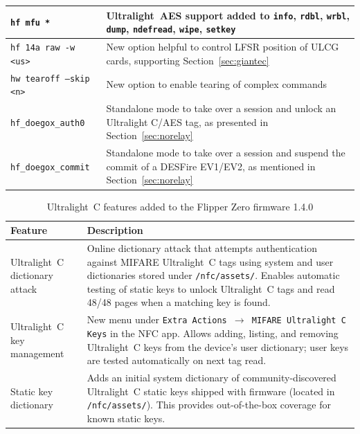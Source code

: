 \documentclass[10pt,letterpaper]{article}
\begin{document}
\begin{table}[ht]
\begin{tabularx}{\textwidth}{|l|X|}
    {\small \texttt{hf mfu *}} & Ultralight~AES support added to \texttt{info}, \texttt{rdbl}, \texttt{wrbl}, \texttt{dump}, \texttt{ndefread}, \texttt{wipe}, \texttt{setkey}\\ \hline
    {\small \texttt{hf 14a raw -w <us>}} & New option helpful to control LFSR position of ULCG cards, supporting Section~\ref{sec:giantec} \\ \hline
    {\small \texttt{hw tearoff --skip <n>}} & New option to enable tearing of complex commands \\ \hline
    {\small \texttt{hf\_doegox\_auth0}} & Standalone mode to take over a session and unlock an Ultralight C/AES tag, as presented in Section~\ref{sec:norelay} \\ \hline
    {\small \texttt{hf\_doegox\_commit}} & Standalone mode to take over a session and suspend the commit of a DESFire EV1/EV2, as mentioned in Section~\ref{sec:norelay} \\ \hline
  \end{tabularx}
\end{table}
\pagebreak
\begin{table}[ht]
  \centering
  \caption{Ultralight~C features added to the Flipper Zero firmware 1.4.0}
  \label{tab:flipper-ulc-features}
  \begin{tabular}{|l|p{}|}
    \hline
    \textbf{Feature} & \textbf{Description} \\ \hline
    Ultralight~C dictionary attack & Online dictionary attack that attempts authentication against MIFARE Ultralight~C tags using system and user dictionaries stored under \texttt{/nfc/assets/}. Enables automatic testing of static keys to unlock Ultralight~C tags and read 48/48 pages when a matching key is found. \\ \hline
    Ultralight~C key management & New menu under \texttt{Extra Actions $\rightarrow$ MIFARE Ultralight~C Keys} in the NFC app. Allows adding, listing, and removing Ultralight~C keys from the device's user dictionary; user keys are tested automatically on next tag read. \\ \hline
    Static key dictionary & Adds an initial system dictionary of community-discovered Ultralight~C static keys shipped with firmware (located in \texttt{/nfc/assets/}). This provides out-of-the-box coverage for known static keys. \\ \hline
  \end{tabular}
\end{table}
\end{document}
